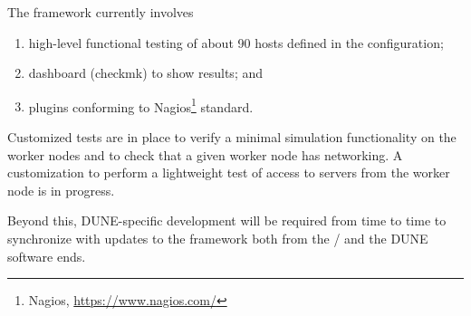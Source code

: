 \documentclass[../main-v1.tex]{subfiles}
\begin{document}
The  framework currently involves 
\begin{enumerate}
\item high-level functional testing of about 90 hosts defined in the  configuration;
\item dashboard (checkmk) to show results; and
\item plugins conforming to Nagios\footnote{Nagios\textregistered, \url{https://www.nagios.com/}} standard. 
\end{enumerate}


\begin{comment} see below (anne)
Some customization of the tests has been done, and  further changes being planned, which are :
\begin{enumerate}
    \item Minimal simulation to test that a simulation works on the worker nodes (Done)
    \item Checking if a given worker node has ipv6 networking (Done)
    \item Lightweight test of access to rucio servers from the worker node (ongoing)
\end{enumerate}
\end{comment}

Customized tests are in place to verify %
a minimal simulation functionality on the worker nodes and to check that a given worker node has  networking. A customization to perform a lightweight test of access to   servers from the worker node is in progress.

Beyond this, DUNE-specific development will be required from time to time %
to synchronize with updates to the framework both from the  /  and the DUNE software ends. %

\end{document}
